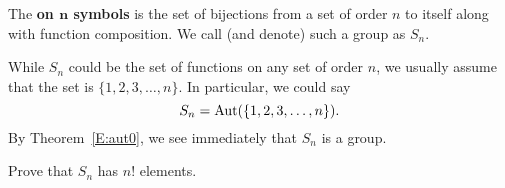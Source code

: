 \documentclass{ximera}
\begin{document}
\begin{definition}
  The  \textbf{on $\boldsymbol{n}$ symbols} is
  the set of bijections from a set of order $n$ to itself along with
  function composition. We call (and denote) such a group as $S_n$.
\end{definition}

\begin{remark}
  While $S_n$ could be the set of functions on any set of order $n$,
  we usually assume that the set is $\{1,2,3,\dots,n\}$. In
  particular, we could say
  \[
  S_n = \operatorname{Aut}(\{1,2,3,\dots,n\}).
  \]
  By Theorem~\ref{E:aut0}, we see immediately that $S_n$ is a group.
\end{remark}

\begin{exercise}
  Prove that $S_n$ has $n!$ elements.
\end{exercise}
\end{document}
